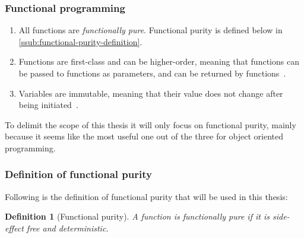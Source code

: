 \documentclass[a4paper,12pt]{article}
\newtheorem{definition}{Definition} %
\begin{document}
\subsubsection{Functional programming} \label{sub:functional-programming}

\begin{enumerate}
  \item All functions are \emph{functionally pure}. Functional purity is defined below in \autoref{ssub:functional-purity-definition}.
\item Functions are first-class and can be higher-order, meaning that functions can be passed to functions as parameters, and can be returned by functions~\cite{jonas-walter}. %
\item Variables are immutable, meaning that their value does not change after being initiated~\cite{jonas-walter}. %
\end{enumerate}

To delimit the scope of this thesis it will only focus on functional purity, mainly because it seems like the most useful one out of the three for object oriented programming.%

\subsubsection{Definition of functional purity} \label{ssub:functional-purity-definition}

Following is the definition of functional purity that will be used in this thesis:

\begin{definition}[Functional purity] \label{def:functional-purity}
  A function is functionally pure if it is \textit{side-effect} free and \textit{deterministic}.
\end{definition}
\end{document}

